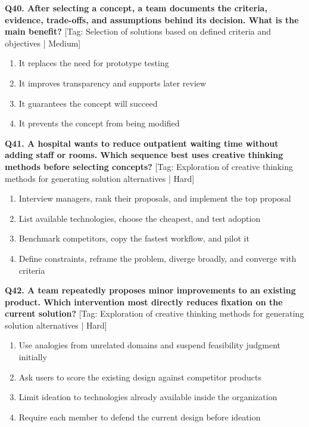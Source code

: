 \noindent\textbf{Q40. After selecting a concept, a team documents the criteria, evidence, trade-offs, and assumptions behind its decision. What is the main benefit?} \hfill [Tag: Selection of solutions based on defined criteria and objectives | Medium]
\begin{enumerate}[label=(\alph*),topsep=2pt,itemsep=1pt,partopsep=0pt,parsep=0pt]
    \item {It replaces the need for prototype testing}
    \item {It improves transparency and supports later review}
    \item {It guarantees the concept will succeed}
    \item {It prevents the concept from being modified}
\end{enumerate}
\vspace{2mm}

\noindent\textbf{Q41. A hospital wants to reduce outpatient waiting time without adding staff or rooms. Which sequence best uses creative thinking methods before selecting concepts?} \hfill [Tag: Exploration of creative thinking methods for generating solution alternatives | Hard]
\begin{enumerate}[label=(\alph*),topsep=2pt,itemsep=1pt,partopsep=0pt,parsep=0pt]
    \item {Interview managers, rank their proposals, and implement the top proposal}
    \item {List available technologies, choose the cheapest, and test adoption}
    \item {Benchmark competitors, copy the fastest workflow, and pilot it}
    \item {Define constraints, reframe the problem, diverge broadly, and converge with criteria}
\end{enumerate}
\vspace{2mm}

\noindent\textbf{Q42. A team repeatedly proposes minor improvements to an existing product. Which intervention most directly reduces fixation on the current solution?} \hfill [Tag: Exploration of creative thinking methods for generating solution alternatives | Hard]
\begin{enumerate}[label=(\alph*),topsep=2pt,itemsep=1pt,partopsep=0pt,parsep=0pt]
    \item {Use analogies from unrelated domains and suspend feasibility judgment initially}
    \item {Ask users to score the existing design against competitor products}
    \item {Limit ideation to technologies already available inside the organization}
    \item {Require each member to defend the current design before ideation}
\end{enumerate}
\vspace{2mm}

